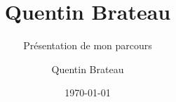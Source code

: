 \documentclass[9pt]{beamer}
\title{Quentin Brateau}
\subtitle{Présentation de mon parcours}
\author{Quentin Brateau}
\institute{\texttt{[image: images/logo\_ensta.jpg]}}
\date{\today}
\begin{document}
	\titlepage
	
	
	
	
	
	
\end{document}
